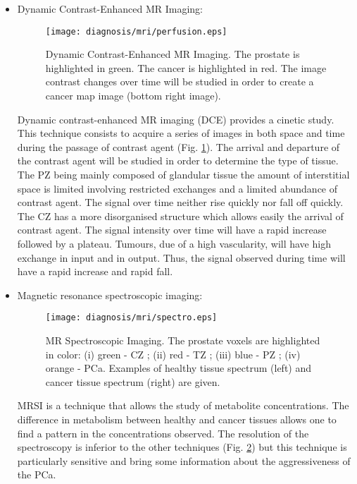 \begin{itemize}
	\item Dynamic Contrast-Enhanced MR Imaging: 
	\begin{figure}
	\centering
	\texttt{[image: diagnosis/mri/perfusion.eps]}
	\caption{Dynamic Contrast-Enhanced MR Imaging. The prostate is highlighted in green. The cancer is highlighted in red. The image contrast changes over time will be studied in order to create a cancer map image (bottom right image).}
	\label{fig:intro:prostatecancer:diagnosis:mri:perfusion}
	\end{figure}
Dynamic contrast-enhanced MR imaging (DCE\g) provides a cinetic study. This technique consists to acquire a series of images in both space and time during the passage of contrast agent (Fig. \ref{fig:intro:prostatecancer:diagnosis:mri:perfusion}). The arrival and departure of the contrast agent will be studied in order to determine the type of tissue. The PZ being mainly composed of glandular tissue the amount of interstitial space is limited involving restricted exchanges and a limited abundance of contrast agent. The signal over time neither rise quickly nor fall off quickly. The CZ has a more disorganised structure which allows easily the arrival of contrast agent. The signal intensity over time will have a rapid increase followed by a plateau. Tumours, due of a high vascularity, will have high exchange in input and in output. Thus, the signal observed during time will have a rapid increase and rapid fall.

	\item Magnetic resonance spectroscopic imaging:
	\begin{figure}
	\centering
	\texttt{[image: diagnosis/mri/spectro.eps]}
	\caption{MR Spectroscopic Imaging. The prostate voxels are highlighted in color: (i) green - CZ ; (ii) red - TZ ; (iii) blue - PZ ; (iv) orange - PCa. Examples of healthy tissue spectrum (left) and cancer tissue spectrum (right) are given.}
	\label{fig:intro:prostatecancer:diagnosis:mri:spectro}
	\end{figure}
MRSI is a technique that allows the study of metabolite concentrations. The difference in metabolism between healthy and cancer tissues allows one to find a pattern in the concentrations observed. The resolution of the spectroscopy is inferior to the other techniques (Fig. \ref{fig:intro:prostatecancer:diagnosis:mri:spectro}) but this technique is particularly sensitive and bring some information about the aggressiveness of the PCa.
\end{itemize}
